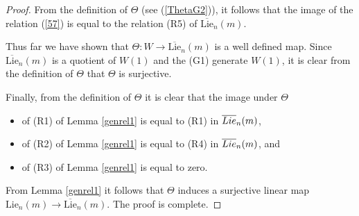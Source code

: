 \documentclass[10pt,a4paper]{amsart}
\begin{document}
\begin{proof}
	From the definition of $\Theta$ (see (\ref{ThetaG2})), it follows that the image of the relation (\ref{57}) is equal to the relation (R5) of $\overline{\text{Lie}}_n(m)$. 
	
	Thus far we have shown that $\Theta:W \to \overline{\text{Lie}}_n(m)$ is a well defined map. Since $\overline{\text{Lie}}_n(m)$ is a quotient of $W(1)$ and the (G1) generate $W(1)$, it is clear from the definition of $\Theta$ that $\Theta$ is surjective.
	
	Finally, from the definition of $\Theta$ it is clear that the image under $\Theta$
	\begin{itemize}
		\item of (R1) of Lemma \ref{genrel1} is equal to (R1) in $\overline{\textup{Lie}}_n(m)$,
		\item of (R2) of Lemma \ref{genrel1} is equal to (R4) in $\overline{\textup{Lie}}_n(m)$, and
		\item of (R3) of Lemma \ref{genrel1} is equal to zero.
	\end{itemize}
From Lemma \ref{genrel1} it follows that $\Theta$ induces a surjective linear map $\text{Lie}_n(m) \to \overline{\text{Lie}}_n(m)$. The proof is complete.
	
	

	
 	\end{proof}
\end{document}
